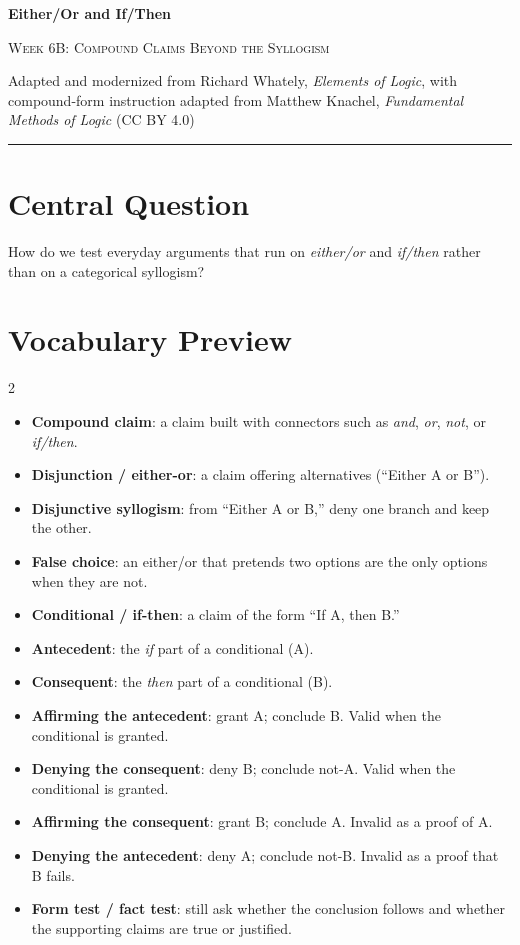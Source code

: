 \documentclass[12pt]{article}
\begin{document}
\begin{center}
{\LARGE\bfseries Either/Or and If/Then}\par\vspace{0.2em}
{\large\scshape Week 6B: Compound Claims Beyond the Syllogism}\par\vspace{0.4em}
{Adapted and modernized from Richard Whately, \textit{Elements of Logic}, with compound-form instruction adapted from Matthew Knachel, \textit{Fundamental Methods of Logic} (CC BY 4.0)}\par\vspace{0.5em}
\rule{0.82\textwidth}{0.4pt}
\end{center}

\section*{Central Question}
How do we test everyday arguments that run on \textit{either/or} and \textit{if/then} rather than on a categorical syllogism?

\section*{Vocabulary Preview}
\begin{multicols}{2}
\begin{itemize}[leftmargin=*, itemsep=0.14em]
\item \textbf{Compound claim}: a claim built with connectors such as \textit{and}, \textit{or}, \textit{not}, or \textit{if/then}.
\item \textbf{Disjunction / either-or}: a claim offering alternatives (``Either A or B'').
\item \textbf{Disjunctive syllogism}: from ``Either A or B,'' deny one branch and keep the other.
\item \textbf{False choice}: an either/or that pretends two options are the only options when they are not.
\item \textbf{Conditional / if-then}: a claim of the form ``If A, then B.''
\item \textbf{Antecedent}: the \textit{if} part of a conditional (A).
\item \textbf{Consequent}: the \textit{then} part of a conditional (B).
\item \textbf{Affirming the antecedent}: grant A; conclude B. Valid when the conditional is granted.
\item \textbf{Denying the consequent}: deny B; conclude not-A. Valid when the conditional is granted.
\item \textbf{Affirming the consequent}: grant B; conclude A. Invalid as a proof of A.
\item \textbf{Denying the antecedent}: deny A; conclude not-B. Invalid as a proof that B fails.
\item \textbf{Form test / fact test}: still ask whether the conclusion follows and whether the supporting claims are true or justified.
\end{itemize}
\end{multicols}
\end{document}
